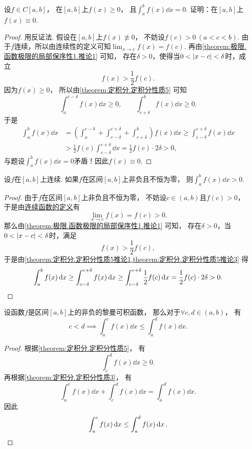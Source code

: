 \begin{example}
设\(f \in C[a,b]\)，
在\([a,b]\)上\(f(x)\geq0\)，
且\(\int_a^b f(x) \dd{x} = 0\).
证明：在\([a,b]\)上\(f(x)\equiv0\).
\begin{proof}
用反证法.
假设在\([a,b]\)上\(f(x)\not\equiv0\)，
不妨设\(f(c)>0\ (a<c<b)\).
由于\(f\)连续，所以由连续性的定义可知\(\lim_{x \to c} f(x) = f(c)\).
再由\cref{theorem:极限.函数极限的局部保序性1.推论1} 可知，
存在\(\delta>0\)，使得当\(0<\abs{x-c}<\delta\)时，成立\[
	f(x) > \frac12 f(c).
\]
因为\(f(x)\geq0\)，
所以由\cref{theorem:定积分.定积分性质5} 可知\[
	\int_a^{c-\delta} f(x) \dd{x} \geq 0,
	\qquad
	\int_{c+\delta}^b f(x) \dd{x} \geq 0.
\]
于是\begin{align*}
	\int_a^b f(x) \dd{x}
	&= \left( \int_a^{c-\delta} + \int_{c-\delta}^{c+\delta} + \int_{c+\delta}^b \right) f(x) \dd{x}
	\geq \int_{c-\delta}^{c+\delta} f(x) \dd{x} \\
	&> \frac12 f(c) \int_{c-\delta}^{c+\delta} \dd{x}
	= \frac12 f(c) \cdot 2\delta
	> 0,
\end{align*}
与题设\(\int_a^b f(x) \dd{x} = 0\)矛盾！因此\(f(x)\equiv0\).
\end{proof}
\end{example}
\begin{example}
设\(f\)在\([a,b]\)上连续.
如果\(f\)在区间\([a,b]\)上非负且不恒为零，
则\(\int_a^b f(x) \dd{x} > 0\).
\begin{proof}
由于\(f\)在区间\([a,b]\)上非负且不恒为零，
不妨设\(c \in (a,b)\)且\(f(c)>0\)，
于是由\hyperref[definition:极限.函数在一点的连续性]{连续函数的定义}有\[
	\lim_{x \to c} f(x) = f(c) > 0.
\]
那么由\cref{theorem:极限.函数极限的局部保序性1.推论1} 可知，
存在\(\delta>0\)，当\(0 < \abs{x-c} < \delta\)时，满足\[
	f(x) > \frac12 f(c),
\]
于是由\cref{theorem:定积分.定积分性质5推论1,theorem:定积分.定积分性质5推论3} 得\[
	\int_a^b f(x) \dd{x}
	\geq \int_{c-\delta}^{c+\delta} f(x) \dd{x}
	\geq \int_{c-\delta}^{c+\delta} \frac12 f(c) \dd{x}
	= \frac12 f(c) \cdot 2 \delta
	> 0.
	\qedhere
\]
\end{proof}
\end{example}

\begin{corollary}\label{theorem:定积分.定积分性质5推论3}
设函数\(f\)是区间\([a,b]\)上的非负的黎曼可积函数，
那么对于\(\forall c,d\in(a,b)\)，
有\[
	c<d
	\implies
	\int_a^c f(x) \dd{x} \leq \int_a^d f(x) \dd{x}.
\]
\begin{proof}
根据\cref{theorem:定积分.定积分性质5}，
有\[
	\int_c^d f(x) \dd{x} \geq 0.
\]
再根据\cref{theorem:定积分.定积分性质3}，
有\[
	\int_a^c f(x) \dd{x}
	+ \int_c^d f(x) \dd{x}
	= \int_a^d f(x) \dd{x}.
\]
因此\[
	\int_a^c f(x) \dd{x}
	\leq
	\int_a^d f(x) \dd{x}.
	\qedhere
\]
\end{proof}
\end{corollary}

